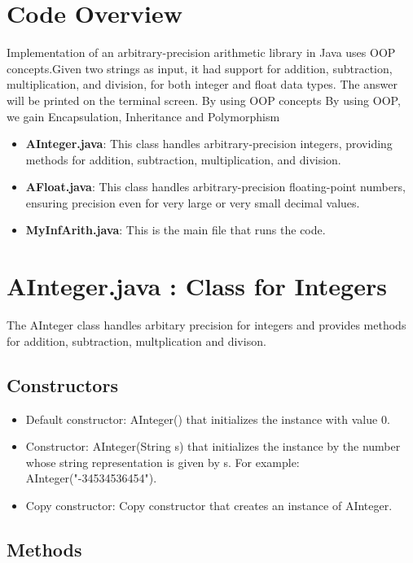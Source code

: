 \documentclass{article}
\begin{document}
\newpage
\section*{Code Overview}
Implementation of an arbitrary-precision arithmetic library in Java
uses OOP concepts.Given two strings as input, it had support
for addition, subtraction, multiplication, and division, for both integer and
float data types. The answer will be printed on the terminal screen.
By using OOP concepts By using OOP, we gain Encapsulation, Inheritance and Polymorphism

\begin{itemize}
    \item \textbf{AInteger.java}: This class handles arbitrary-precision integers, providing methods for addition, subtraction, multiplication, and division.
    \item \textbf{AFloat.java}: This class handles arbitrary-precision floating-point numbers, ensuring precision even for very large or very small decimal values.
    \item \textbf{MyInfArith.java}: This is the main file that runs the code.
\end{itemize}


\section{AInteger.java : Class for Integers}
The AInteger class handles arbitary precision for integers and provides methods for addition, subtraction, multplication and divison.
\subsection*{Constructors}
\begin{itemize}
    \item Default constructor: AInteger() that initializes the instance with value 0.
    \item Constructor: AInteger(String s) that initializes the instance by the number whose string representation is given by s. For example: AInteger("-34534536454").
    \item Copy constructor: Copy constructor that creates an instance of AInteger.
\end{itemize}

\subsection*{Methods}
\end{document}
